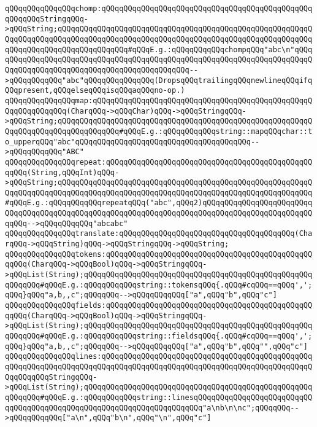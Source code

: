 \verb|qQQqqQQqqQQqqQQqchomp:qQQqqQQqqQQqqQQqqQQqqQQqqQQqqQQqqQQqqQQqqQQqqQQqqQQqqQQqStringqQQq->qQQqString;qQQqqQQqqQQqqQQqqQQqqQQqqQQqqQQqqQQqqQQqqQQqqQQqqQQqqQQqqQQqqQQqqQQqqQQqqQQqqQQqqQQqqQQqqQQqqQQqqQQqqQQqqQQqqQQqqQQqqQQqqQQqqQQqqQQqqQQqqQQqqQQqqQQqqQQqqQQq#qQQqE.g.:qQQqqQQqqQQqchompqQQq"abc\n"qQQqqQQqqQQqqQQqqQQqqQQqqQQqqQQqqQQqqQQqqQQqqQQqqQQqqQQqqQQqqQQqqQQqqQQqqQQqqQQqqQQqqQQqqQQqqQQqqQQqqQQqqQQqqQQqqQQq-->qQQqqQQqqQQq"abc"qQQqqQQqqQQqqQQq(DropsqQQqtrailingqQQqnewlineqQQqifqQQqpresent,qQQqelseqQQqisqQQqaqQQqno-op.)|\newline
\verb|qQQqqQQqqQQqqQQqmap:qQQqqQQqqQQqqQQqqQQqqQQqqQQqqQQqqQQqqQQqqQQqqQQqqQQqqQQqqQQqqQQq(CharqQQq->qQQqChar)qQQq->qQQqStringqQQq->qQQqString;qQQqqQQqqQQqqQQqqQQqqQQqqQQqqQQqqQQqqQQqqQQqqQQqqQQqqQQqqQQqqQQqqQQqqQQqqQQqqQQqqQQq#qQQqE.g.:qQQqqQQqqQQqstring::mapqQQqchar::to_upperqQQq"abc"qQQqqQQqqQQqqQQqqQQqqQQqqQQqqQQqqQQqqQQq-->qQQqqQQqqQQq"ABC"|\newline
\verb|qQQqqQQqqQQqqQQqrepeat:qQQqqQQqqQQqqQQqqQQqqQQqqQQqqQQqqQQqqQQqqQQqqQQqqQQq(String,qQQqInt)qQQq->qQQqString;qQQqqQQqqQQqqQQqqQQqqQQqqQQqqQQqqQQqqQQqqQQqqQQqqQQqqQQqqQQqqQQqqQQqqQQqqQQqqQQqqQQqqQQqqQQqqQQqqQQqqQQqqQQqqQQqqQQqqQQqqQQqqQQq#qQQqE.g.:qQQqqQQqqQQqrepeatqQQq("abc",qQQq2)qQQqqQQqqQQqqQQqqQQqqQQqqQQqqQQqqQQqqQQqqQQqqQQqqQQqqQQqqQQqqQQqqQQqqQQqqQQqqQQqqQQqqQQqqQQqqQQqqQQq-->qQQqqQQqqQQq"abcabc"|\newline
\newline
\verb|qQQqqQQqqQQqqQQqtranslate:qQQqqQQqqQQqqQQqqQQqqQQqqQQqqQQqqQQqqQQq(CharqQQq->qQQqString)qQQq->qQQqStringqQQq->qQQqString;|\newline
\verb|qQQqqQQqqQQqqQQqtokens:qQQqqQQqqQQqqQQqqQQqqQQqqQQqqQQqqQQqqQQqqQQqqQQqqQQq(CharqQQq->qQQqBool)qQQq->qQQqStringqQQq->qQQqList(String);qQQqqQQqqQQqqQQqqQQqqQQqqQQqqQQqqQQqqQQqqQQqqQQqqQQqqQQqqQQq#qQQqE.g.:qQQqqQQqqQQqstring::tokensqQQq{.qQQq#cqQQq==qQQq',';qQQq}qQQq"a,b,,c";qQQqqQQq-->qQQqqQQqqQQq["a",qQQq"b",qQQq"c"]|\newline
\verb|qQQqqQQqqQQqqQQqfields:qQQqqQQqqQQqqQQqqQQqqQQqqQQqqQQqqQQqqQQqqQQqqQQqqQQq(CharqQQq->qQQqBool)qQQq->qQQqStringqQQq->qQQqList(String);qQQqqQQqqQQqqQQqqQQqqQQqqQQqqQQqqQQqqQQqqQQqqQQqqQQqqQQqqQQq#qQQqE.g.:qQQqqQQqqQQqstring::fieldsqQQq{.qQQq#cqQQq==qQQq',';qQQq}qQQq"a,b,,c";qQQqqQQq-->qQQqqQQqqQQq["a",qQQq"b",qQQq"",qQQq"c"]|\newline
\verb|qQQqqQQqqQQqqQQqlines:qQQqqQQqqQQqqQQqqQQqqQQqqQQqqQQqqQQqqQQqqQQqqQQqqQQqqQQqqQQqqQQqqQQqqQQqqQQqqQQqqQQqqQQqqQQqqQQqqQQqqQQqqQQqqQQqqQQqqQQqqQQqqQQqStringqQQq->qQQqList(String);qQQqqQQqqQQqqQQqqQQqqQQqqQQqqQQqqQQqqQQqqQQqqQQqqQQqqQQqqQQq#qQQqE.g.:qQQqqQQqqQQqstring::linesqQQqqQQqqQQqqQQqqQQqqQQqqQQqqQQqqQQqqQQqqQQqqQQqqQQqqQQqqQQqqQQqqQQqqQQq"a\nb\n\nc";qQQqqQQq-->qQQqqQQqqQQq["a\n",qQQq"b\n",qQQq"\n",qQQq"c"]|\newline
